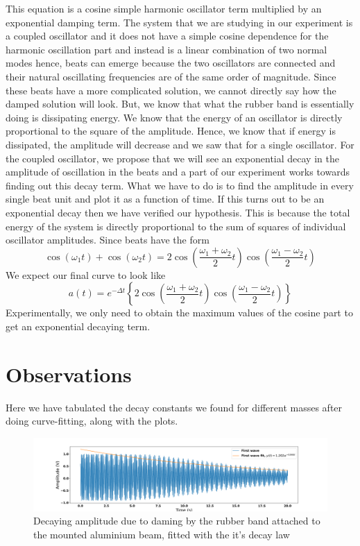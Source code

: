 This equation is a cosine simple harmonic oscillator term multiplied by an exponential damping term. The system that we are studying in our experiment is a coupled oscillator and it does not have a simple cosine dependence for the harmonic oscillation part and instead is a linear combination of two normal modes hence, beats can emerge because the two oscillators are connected and their natural oscillating frequencies are of the same order of magnitude. Since these beats have a more complicated solution, we cannot directly say how the damped solution will look. But, we know that what the rubber band is essentially doing is dissipating energy. We know that the energy of an oscillator is directly proportional to the square of the amplitude. Hence, we know that if energy is dissipated, the amplitude will decrease and we saw that for a single oscillator. For the coupled oscillator, we propose that we will see an exponential decay in the amplitude of oscillation in the beats and a part of our experiment works towards finding out this decay term. What we have to do is to find the amplitude in every single beat unit and plot it as a function of time. If this turns out to be an exponential decay then we have verified our hypothesis. This is because the total energy of the system is directly proportional to the sum of squares of individual oscillator amplitudes.
Since beats have the form 
\[\cos \left(\omega_{1} t\right)+\cos \left(\omega_{2} t\right)=2 \cos \left(\frac{\omega_{1}+\omega_{2}}{2} t\right) \cos \left(\frac{\omega_{1}-\omega_{2}}{2} t\right)\]
We expect our final curve to look like 
\[a(t)=e^{-\Delta t}\left\{  2 \cos \left(\frac{\omega_{1}+\omega_{2}}{2} t\right) \cos \left(\frac{\omega_{1}-\omega_{2}}{2} t\right)\right\}\]
Experimentally, we only need to obtain the maximum values of the cosine part to get an exponential decaying term.

\section{Observations}
Here we have tabulated the decay constants we found for different masses after doing curve-fitting, along with the plots.

\begin{figure}[H]
	\centering
	\includegraphics[scale=0.35]{03_1.png}
	\caption{Decaying amplitude due to daming by the rubber band attached to the mounted aluminium beam, fitted with the it's decay law}
	\label{fig:mb-fe-0}
\end{figure}

